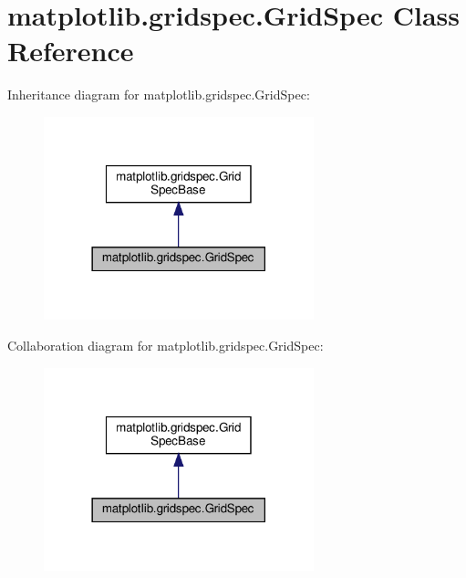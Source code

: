 \hypertarget{classmatplotlib_1_1gridspec_1_1GridSpec}{}\section{matplotlib.\+gridspec.\+Grid\+Spec Class Reference}
\label{classmatplotlib_1_1gridspec_1_1GridSpec}


Inheritance diagram for matplotlib.\+gridspec.\+Grid\+Spec\+:
\nopagebreak
\begin{figure}[H]
\begin{center}
\leavevmode
\includegraphics[width=222pt]{classmatplotlib_1_1gridspec_1_1GridSpec__inherit__graph}
\end{center}
\end{figure}


Collaboration diagram for matplotlib.\+gridspec.\+Grid\+Spec\+:
\nopagebreak
\begin{figure}[H]
\begin{center}
\leavevmode
\includegraphics[width=222pt]{classmatplotlib_1_1gridspec_1_1GridSpec__coll__graph}
\end{center}
\end{figure}

